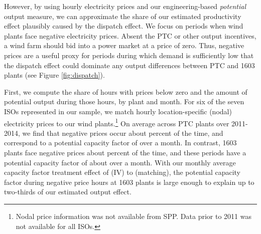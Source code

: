 \documentclass[12pt]{article}
\begin{document}
However, by using hourly electricity prices and our engineering-based \emph{potential} output measure, we can approximate the share of our estimated productivity effect plausibly caused by the dispatch effect. We focus on periods when wind plants face negative electricity prices. Absent the PTC or other output incentives, a wind farm should bid into a power market at a price of zero. Thus, negative prices are a useful proxy for periods during which demand is sufficiently low that the dispatch effect could dominate any output differences between PTC and 1603 plants (see Figure \ref{fig:dispatch}).

First, we compute the share of hours with prices below zero and the amount of potential output during those hours, by plant and month. For six of the seven ISOs represented in our sample, we match hourly location-specific (nodal) electricity prices to our wind plants.\footnote{Nodal price information was not available from SPP. Data prior to 2011 was not available for all ISOs.} On average across PTC plants over 2011-2014, we find that negative prices occur about  \unskip percent of the time, and correspond to a potential capacity factor of  \unskip over a month. In contrast, 1603 plants face negative prices about  \unskip percent of the time, and these periods have a potential capacity factor of about  \unskip over a month. With our monthly average capacity factor treatment effect of  \unskip (IV) to  \unskip (matching), the potential capacity factor during negative price hours at 1603 plants is large enough to explain up to two-thirds of our estimated output effect.
\end{document}
